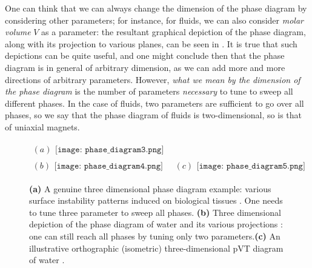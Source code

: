 One can \naively think that we can always change the dimension of the phase diagram by considering other parameters; for instance, for fluids, we can also consider \emph{molar volume} $V$ as a parameter: the resultant graphical depiction of the phase diagram, along with its projection to various planes, can be seen in \figref{\ref{fig: phase diagram 2}}. It is true that such depictions can be quite useful, and one might conclude then that the phase diagram is in general of arbitrary dimension, as we can add more and more directions of arbitrary parameters. However, \emph{what we mean by the dimension of the phase diagram} is the number of parameters \emph{necessary} to tune to sweep all different phases. In the case of fluids, two parameters are sufficient to go over all phases, so we say that the phase diagram of fluids is two-dimensional, so is that of uniaxial magnets.

\begin{figure}
	\centering 
	\begin{gather*}
		(a)\begin{aligned}\texttt{[image: phase\_diagram3.png]}
		\end{aligned}\\(b)\begin{aligned}\texttt{[image: phase\_diagram4.png]}\end{aligned}\quad
		(c)\begin{aligned}\texttt{[image: phase\_diagram5.png]}
		\end{aligned}
	\end{gather*}
	\caption[Phase diagrams in three dimensions]{\label{fig: phase diagram 2} \textbf{(a)} A genuine three dimensional phase diagram example: various surface instability patterns induced on biological tissues \cite{wang2015three}. One needs to tune three parameter to sweep all phases. \textbf{(b)} Three dimensional depiction of the phase diagram of water and its various projections \cite{glasser2004water}: one can still reach all phases by tuning only two parameters.\footnotemark \textbf{(c)} An illustrative orthographic (isometric) three-dimensional pVT diagram of water \cite{glasser2004water}.}
\end{figure}

